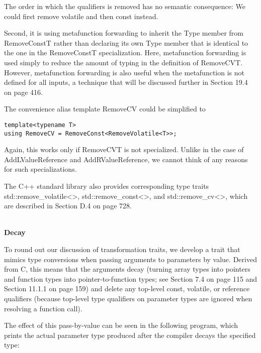 \begin{tcolorbox}[colback=webgreen!5!white,colframe=webgreen!75!black]
\hspace*{0.75cm}The order in which the qualifiers is removed has no semantic consequence: We could first remove volatile and then const instead.
\end{tcolorbox}

Second, it is using metafunction forwarding to inherit the Type member from RemoveConstT rather than declaring its own Type member that is identical to the one in the RemoveConstT specialization. Here, metafunction forwarding is used simply to reduce the amount of typing in the definition of RemoveCVT. However, metafunction forwarding is also useful when the metafunction is not defined for all inputs, a technique that will be discussed further in Section 19.4 on page 416. 

The convenience alias template RemoveCV could be simplified to

\begin{lstlisting}[style=styleCXX]
template<typename T>
using RemoveCV = RemoveConst<RemoveVolatile<T>>;
\end{lstlisting}

Again, this works only if RemoveCVT is not specialized. Unlike in the case of AddLValueReference and AddRValueReference, we cannot think of any reasons for such specializations.

The C++ standard library also provides corresponding type traits std::remove\_volatile<>, std::remove\_const<>, and std::remove\_cv<>, which are described in Section D.4 on page 728.

\hspace*{\fill} \\ %
\noindent
\textbf{Decay}

To round out our discussion of transformation traits, we develop a trait that mimics type conversions when passing arguments to parameters by value. Derived from C, this means that the arguments decay (turning array types into pointers and function types into pointer-to-function types; see Section 7.4 on page 115 and Section 11.1.1 on page 159) and delete any top-level const, volatile, or reference qualifiers (because top-level type qualifiers on parameter types are ignored when resolving a function call).

The effect of this pass-by-value can be seen in the following program, which prints the actual parameter type produced after the compiler decays the specified type:

